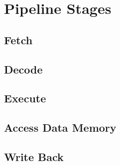 \section{Pipeline Stages}

\subsection{Fetch}
\subsection{Decode}
\subsection{Execute}
\subsection{Access Data Memory}
\subsection{Write Back}
